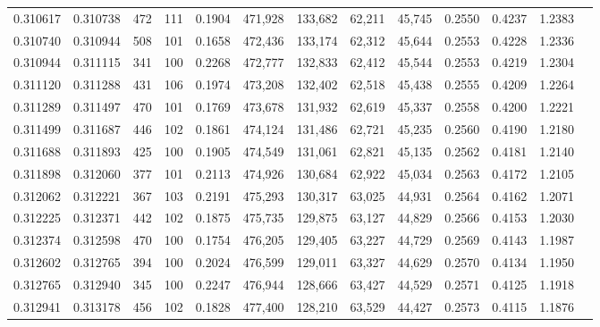 \begin{tabular}{rrrrrrrrrrrrr}
0.310617 & 0.310738 &   472 & 111 &                                     0.1904 & 471,928 & 133,682 &  62,211 &  45,745 & 0.2550 & 0.4237 & 1.2383 \\
0.310740 & 0.310944 &   508 & 101 &                                     0.1658 & 472,436 & 133,174 &  62,312 &  45,644 & 0.2553 & 0.4228 & 1.2336 \\
0.310944 & 0.311115 &   341 & 100 &                                     0.2268 & 472,777 & 132,833 &  62,412 &  45,544 & 0.2553 & 0.4219 & 1.2304 \\
0.311120 & 0.311288 &   431 & 106 &                                     0.1974 & 473,208 & 132,402 &  62,518 &  45,438 & 0.2555 & 0.4209 & 1.2264 \\
0.311289 & 0.311497 &   470 & 101 &                                     0.1769 & 473,678 & 131,932 &  62,619 &  45,337 & 0.2558 & 0.4200 & 1.2221 \\
0.311499 & 0.311687 &   446 & 102 &                                     0.1861 & 474,124 & 131,486 &  62,721 &  45,235 & 0.2560 & 0.4190 & 1.2180 \\
0.311688 & 0.311893 &   425 & 100 &                                     0.1905 & 474,549 & 131,061 &  62,821 &  45,135 & 0.2562 & 0.4181 & 1.2140 \\
0.311898 & 0.312060 &   377 & 101 &                                     0.2113 & 474,926 & 130,684 &  62,922 &  45,034 & 0.2563 & 0.4172 & 1.2105 \\
0.312062 & 0.312221 &   367 & 103 &                                     0.2191 & 475,293 & 130,317 &  63,025 &  44,931 & 0.2564 & 0.4162 & 1.2071 \\
0.312225 & 0.312371 &   442 & 102 &                                     0.1875 & 475,735 & 129,875 &  63,127 &  44,829 & 0.2566 & 0.4153 & 1.2030 \\
0.312374 & 0.312598 &   470 & 100 &                                     0.1754 & 476,205 & 129,405 &  63,227 &  44,729 & 0.2569 & 0.4143 & 1.1987 \\
0.312602 & 0.312765 &   394 & 100 &                                     0.2024 & 476,599 & 129,011 &  63,327 &  44,629 & 0.2570 & 0.4134 & 1.1950 \\
0.312765 & 0.312940 &   345 & 100 &                                     0.2247 & 476,944 & 128,666 &  63,427 &  44,529 & 0.2571 & 0.4125 & 1.1918 \\
0.312941 & 0.313178 &   456 & 102 &                                     0.1828 & 477,400 & 128,210 &  63,529 &  44,427 & 0.2573 & 0.4115 & 1.1876 \\

\end{tabular}
